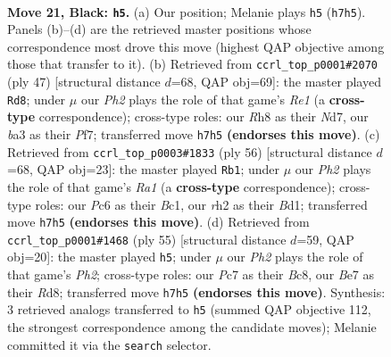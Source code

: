 \documentclass[11pt]{article}
\begin{document}
\clearpage

\begin{figure}[p]\centering
\begin{subfigure}{0.46\textwidth}\centering
\resizebox{\linewidth}{!}{%
\newchessgame
\chessboard[
  setfen={1rbk3r/p1p1bp1p/2p3p1/2P5/PP3P1P/B7/7R/RN2K3 b Q - 6 21},
  showmover=false,
  pgfstyle=straightmove, color=movearrow, markmove={h7-h5}
]}
\caption{}
\end{subfigure}\hfill
\begin{subfigure}{0.46\textwidth}\centering
\resizebox{\linewidth}{!}{%
\newchessgame
\chessboard[
  setfen={4rk2/pp1nbpp1/4p1p1/1N4P1/2P2B2/7P/PP2RP2/6K1 b - - 2 24},
  showmover=false,
  pgfstyle=straightmove, color=movearrow, markmove={e8-d8}
]}
\caption{}
\end{subfigure}
\\[4pt]
\begin{subfigure}{0.46\textwidth}\centering
\resizebox{\linewidth}{!}{%
\newchessgame
\chessboard[
  setfen={1r6/3k2pp/1np2p2/p1b1p3/P3P2P/2P2P2/4K1P1/R1BB4 w - - 1 29},
  showmover=false,
  pgfstyle=straightmove, color=movearrow, markmove={a1-b1}
]}
\caption{}
\end{subfigure}\hfill
\begin{subfigure}{0.46\textwidth}\centering
\resizebox{\linewidth}{!}{%
\newchessgame
\chessboard[
  setfen={2br2k1/5pbp/p1B3p1/2pPP3/4NP2/7P/1rp3P1/2R1R1K1 b - - 1 28},
  showmover=false,
  pgfstyle=straightmove, color=movearrow, markmove={h7-h5}
]}
\caption{}
\end{subfigure}
\caption{\textbf{Move 21, Black: \texttt{h5}.} (a) Our position; Melanie plays \texttt{h5} (\texttt{h7h5}). Panels (b)--(d) are the retrieved master positions whose correspondence most drove this move (highest QAP objective among those that transfer to it). (b) Retrieved from \texttt{ccrl\_top\_p0001\#2070} (ply 47) [structural distance $d$=68, QAP obj=69]: the master played \texttt{Rd8}; under $\mu$ our \emph{Ph2} plays the role of that game's \emph{Re1} (a \textbf{cross-type} correspondence); cross-type roles: our \emph{R}h8 as their \emph{N}d7, our \emph{b}a3 as their \emph{P}f7; transferred move \texttt{h7h5} \textbf{(endorses this move)}. (c) Retrieved from \texttt{ccrl\_top\_p0003\#1833} (ply 56) [structural distance $d$=68, QAP obj=23]: the master played \texttt{Rb1}; under $\mu$ our \emph{Ph2} plays the role of that game's \emph{Ra1} (a \textbf{cross-type} correspondence); cross-type roles: our \emph{P}c6 as their \emph{B}c1, our \emph{r}h2 as their \emph{B}d1; transferred move \texttt{h7h5} \textbf{(endorses this move)}. (d) Retrieved from \texttt{ccrl\_top\_p0001\#1468} (ply 55) [structural distance $d$=59, QAP obj=20]: the master played \texttt{h5}; under $\mu$ our \emph{Ph2} plays the role of that game's \emph{Ph2}; cross-type roles: our \emph{P}c7 as their \emph{B}c8, our \emph{B}e7 as their \emph{R}d8; transferred move \texttt{h7h5} \textbf{(endorses this move)}. Synthesis: 3 retrieved analogs transferred to \texttt{h5} (summed QAP objective 112, the strongest correspondence among the candidate moves); Melanie committed it via the \texttt{search} selector.}
\label{fig:thought-m41}
\end{figure}
\end{document}
